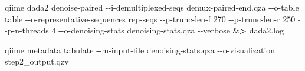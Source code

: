 \documentclass[
]{article}
\newenvironment{Shaded}{\begin{snugshade}}{\end{snugshade}}
\newcommand{\DecValTok}[1]{\textcolor[rgb]{0.00,0.00,0.81}{#1}}
\newcommand{\ErrorTok}[1]{\textcolor[rgb]{0.64,0.00,0.00}{\textbf{#1}}}
\newcommand{\NormalTok}[1]{#1}
\newcommand{\SpecialCharTok}[1]{\textcolor[rgb]{0.00,0.00,0.00}{#1}}
\begin{document}
\begin{Shaded}
\begin{Highlighting}[]
\NormalTok{qiime dada2 denoise}\SpecialCharTok{{-}}\NormalTok{paired }\SpecialCharTok{{-}{-}}\NormalTok{i}\SpecialCharTok{{-}}\NormalTok{demultiplexed}\SpecialCharTok{{-}}\NormalTok{seqs demux}\SpecialCharTok{{-}}\NormalTok{paired}\SpecialCharTok{{-}}\NormalTok{end.qza }\SpecialCharTok{{-}{-}}\NormalTok{o}\SpecialCharTok{{-}}\NormalTok{table table }\SpecialCharTok{{-}{-}}\NormalTok{o}\SpecialCharTok{{-}}\NormalTok{representative}\SpecialCharTok{{-}}\NormalTok{sequences rep}\SpecialCharTok{{-}}\NormalTok{seqs  }\SpecialCharTok{{-}{-}}\NormalTok{p}\SpecialCharTok{{-}}\NormalTok{trunc}\SpecialCharTok{{-}}\NormalTok{len}\SpecialCharTok{{-}}\NormalTok{f }\DecValTok{270} \SpecialCharTok{{-}{-}}\NormalTok{p}\SpecialCharTok{{-}}\NormalTok{trunc}\SpecialCharTok{{-}}\NormalTok{len}\SpecialCharTok{{-}}\NormalTok{r }\DecValTok{250} \SpecialCharTok{{-}{-}}\NormalTok{p}\SpecialCharTok{{-}}\NormalTok{n}\SpecialCharTok{{-}}\NormalTok{threads }\DecValTok{4} \SpecialCharTok{{-}{-}}\NormalTok{o}\SpecialCharTok{{-}}\NormalTok{denoising}\SpecialCharTok{{-}}\NormalTok{stats denoising}\SpecialCharTok{{-}}\NormalTok{stats.qza }\SpecialCharTok{{-}{-}}\NormalTok{verbose }\SpecialCharTok{\&}\ErrorTok{\textgreater{}}\NormalTok{ dada2.log}

\NormalTok{qiime metadata tabulate }\SpecialCharTok{{-}{-}}\NormalTok{m}\SpecialCharTok{{-}}\NormalTok{input}\SpecialCharTok{{-}}\NormalTok{file denoising}\SpecialCharTok{{-}}\NormalTok{stats.qza }\SpecialCharTok{{-}{-}}\NormalTok{o}\SpecialCharTok{{-}}\NormalTok{visualization step2\_output.qzv}


\end{Highlighting}
\end{Shaded}
\end{document}
